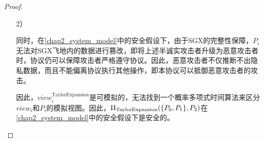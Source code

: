 \begin{proof}
\begin{itemize}
		\item [2）]
		
		同时，在\ref{chap2_system_model}中的安全假设下，由于SGX的完整性保障\cite{SGX_Explained}，$P_i$无法对SGX飞地内的数据进行篡改，即将上述半诚实攻击者升级为恶意攻击者时，协议仍可以保障攻击者严格遵守协议。因此，恶意攻击者不仅推断不出隐私数据，而且不能偏离协议执行其他操作，即本协议可以抵御恶意攻击者的攻击。
		
		因此，$view_i^{\text{TaylorExpansion}}$是可模拟的，无法找到一个概率多项式时间算法来区分$view_i$和$P_i$的模拟视图。因此，$\Pi_{\rm TaylorExpansion}(\{P_0, P_1\}, P_2)$在\ref{chap2_system_model}中的安全假设下是安全的。
		
	\end{itemize}

%	
%	
%	
%	
%	
%	
%

\end{proof}
